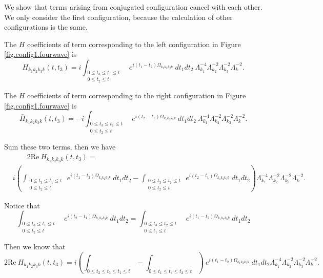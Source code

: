 We show that terms arising from conjugated configuration cancel with each other. We only consider the first configuration, because the calculation of other configurations is the same.

The $H$ coefficients of term corresponding to the left configuration in Figure \ref{fig.config1.fourwave} is 
\begin{equation}
 H_{k_1k_2k_3k}(t,t_3) = i\int_{\substack{0\le t_3\le t_1\le t\\0\le t_2\le t}}\ e^{i(t_1-t_2)\Omega_{k_1k_2k_3k}}\ dt_1dt_2\ \Lambda^{-4}_{k_1}\Lambda^{-2}_{k_2}\Lambda^{-2}_{k_3}\Lambda^{-2}_{k}.
\end{equation}

The $H$ coefficients of term corresponding to the right configuration in Figure \ref{fig.config1.fourwave} is 
\begin{equation}
 \bar{H}_{k_1k_2k_3k}(t,t_3) = -i\int_{\substack{0\le t_3\le t_1\le t\\0\le t_2\le t}}\ e^{i(t_2-t_1)\Omega_{k_1k_2k_3k}}\ dt_1dt_2\ \Lambda^{-4}_{k_1}\Lambda^{-2}_{k_2}\Lambda^{-2}_{k_3}\Lambda^{-2}_{k}.
\end{equation}

Sum these two terms, then we have
\begin{equation}
 \begin{split}
 &\qquad 2\text{Re}\ H_{k_1k_2k_3k}(t,t_3)=
 \\
 &i\left(\int_{\substack{0\le t_3\le t_1\le t\\0\le t_2\le t}}\ e^{i(t_1-t_2)\Omega_{k_1k_2k_3k}}\ dt_1dt_2-\int_{\substack{0\le t_3\le t_1\le t\\0\le t_2\le t}}\ e^{i(t_2-t_1)\Omega_{k_1k_2k_3k}}\ dt_1dt_2\right) \Lambda^{-4}_{k_1}\Lambda^{-2}_{k_2}\Lambda^{-2}_{k_3}\Lambda^{-2}_{k}.
 \end{split}
\end{equation}

Notice that
\begin{equation}
 \int_{\substack{0\le t_3\le t_1\le t\\0\le t_2\le t}}\ e^{i(t_2-t_1)\Omega_{k_1k_2k_3k}}\ dt_1dt_2 = \int_{\substack{0\le t_3\le t_2\le t\\0\le t_1\le t}}\ e^{i(t_1-t_2)\Omega_{k_1k_2k_3k}}\ dt_1dt_2
\end{equation}

Then we know that 
\begin{equation}\label{eq.cancellationofregular}
 2\text{Re}\ H_{k_1k_2k_3k}(t,t_3) = i\left(\int_{0\le t_2\le t_3\le t_1\le t} - \int_{0\le t_1\le t_3\le t_2\le t}\right)\ e^{i(t_1-t_2)\Omega_{k_1k_2k_3k}}\ dt_1dt_2 \Lambda^{-4}_{k_1}\Lambda^{-2}_{k_2}\Lambda^{-2}_{k_3}\Lambda^{-2}_{k}.
\end{equation}

